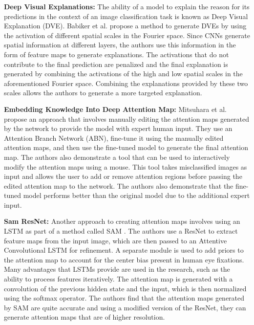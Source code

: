 \documentclass[a4paper,11pt,openright]{book}
\begin{document}
\textbf{Deep Visual Explanations: }
The ability of a model to explain the reason for its predictions in the context of an image classification task is known as Deep Visual Explanation (DVE). Babiker et al. \cite{babikerIntroductionDeepVisual2018} propose a method to generate DVEs by using the activation of different spatial scales in the Fourier space. Since CNNs generate spatial information at different layers, the authors use this information in the form of feature maps to generate explanations. The activations that do not contribute to the final prediction are penalized and the final explanation is generated by combining the activations of the high and low spatial scales in the aforementioned Fourier space. Combining the explanations provided by these two scales allows the authors to generate a more targeted explanation.

\textbf{Embedding Knowledge Into Deep Attention Map: }
Mitsuhara et al. \cite{mitsuharaEmbeddingHumanKnowledge2019} propose an approach that involves manually editing the attention maps generated by the network to provide the model with expert human input. They use an Attention Branch Network (ABN), fine-tune it using the manually edited attention maps, and then use the fine-tuned model to generate the final attention map. The authors also demonstrate a tool that can be used to interactively modify the attention maps using a mouse. This tool takes misclassified images as input and allows the user to add or remove attention regions before passing the edited attention map to the network. The authors also demonstrate that the fine-tuned model performs better than the original model due to the additional expert input.

\textbf{Sam ResNet: }
Another approach to creating attention maps involves using an LSTM as part of a method called SAM \cite{corniaPredictingHumanEye2018} . The authors use a ResNet \cite{heDeepResidualLearning2016} to extract feature maps from the input image, which are then passed to an Attentive Convolutional LSTM for refinement. A separate module is used to add priors to the attention map to account for the center bias present in human eye fixations. Many advantages that LSTMs provide are used in the research, such as the ability to process features iteratively. The attention map is generated with a convolution of the previous hidden state and the input, which is then normalized using the softmax operator. The authors find that the attention maps generated by SAM are quite accurate and using a modified version of the ResNet, they can generate attention maps that are of higher resolution.
\end{document}
